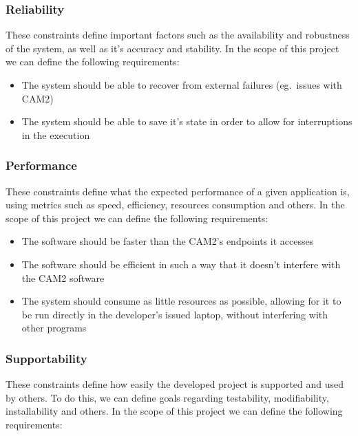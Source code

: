 \subsubsection{Reliability}

These constraints define important factors such as the availability and robustness of the system, as well as it's accuracy and stability. In the scope of this project we can define the following requirements:

\begin{itemize}
	\item The system should be able to recover from external failures (eg.\ issues with CAM2\textsuperscript{\textregistered})
	\item The system should be able to save it's state in order to allow for interruptions in the execution
\end{itemize}

\subsubsection{Performance}

These constraints define what the expected performance of a given application is, using metrics such as speed, efficiency, resources consumption and others. In the scope of this project we can define the following requirements:

\begin{itemize}
	\item The software should be faster than the CAM2\textsuperscript{\textregistered}'s endpoints it accesses
	\item The software should be efficient in such a way that it doesn't interfere with the CAM2\textsuperscript{\textregistered} software
	\item The system should consume as little resources as possible, allowing for it to be run directly in the developer's issued laptop, without interfering with other programs
\end{itemize}

\subsubsection{Supportability}

These constraints define how easily the developed project is supported and used by others. To do this, we can define goals regarding testability, modifiability, installability and others. In the scope of this project we can define the following requirements:

